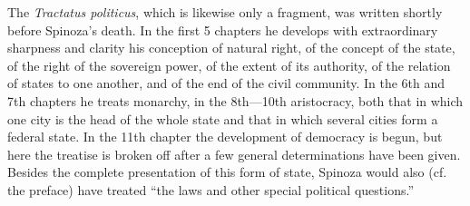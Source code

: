\documentclass[12pt,a4paper,openany]{book}
\begin{document}
The \emph{Tractatus politicus}, which is likewise only a fragment, was
written shortly before Spinoza's death. In the first 5 chapters he
develops with extraordinary sharpness and clarity his conception of
natural right, of the concept of the state, of the right of the sovereign
power, of the extent of its authority, of the relation of states to one
another, and of the end of the civil community. In the 6th and 7th
chapters he treats monarchy, in the 8th---10th aristocracy, both that in
which one city is the head of the whole state and that in which several
cities form a federal state. In the 11th chapter the development of
democracy is begun, but here the treatise is broken off after a few
general determinations have been given. Besides the complete presentation
of this form of state, Spinoza would also (cf. the preface) have treated
``the laws and other special political questions.''
\end{document}
